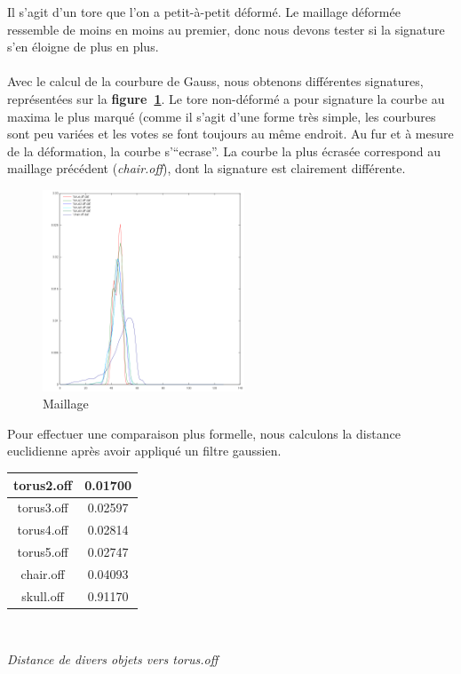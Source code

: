\documentclass{llncs}
\begin{document}
\newline
Il s'agit d'un tore que l'on a petit-à-petit déformé. Le maillage déformée ressemble de moins en moins au premier, donc nous devons tester si la signature s'en éloigne de plus en plus.
\\\\
Avec le calcul de la courbure de Gauss, nous obtenons différentes signatures, représentées sur la \textbf{figure~\ref{tore_gaussian}}. Le tore non-déformé a pour signature la courbe au maxima le plus marqué (comme il s'agit d'une forme très simple, les courbures sont peu variées et les votes se font toujours au même endroit. Au fur et à mesure de la déformation, la courbe s'``ecrase''. La courbe la plus écrasée correspond au maillage précédent (\textit{chair.off}), dont la signature est clairement différente. \\

\begin{figure}
\clearpage
\center
\includegraphics[width=6cm]{img/tores_gaussian.png}
\caption{Maillage}
\label{tore_gaussian}
\end{figure}

Pour effectuer une comparaison plus formelle, nous calculons la distance euclidienne après avoir appliqué un filtre gaussien.

\begin{center}
\begin{tabular}{|c|c|}
\hline torus2.off & 0.01700 \\ 
\hline torus3.off & 0.02597 \\ 
\hline torus4.off & 0.02814 \\ 
\hline torus5.off & 0.02747 \\ 
\hline chair.off &  0.04093 \\ 
\hline skull.off & 0.91170 \\ 
\hline 
\end{tabular} \\
\begin{small}
\textit{Distance de divers objets vers torus.off}
\end{small}
\end{center}
\end{document}
